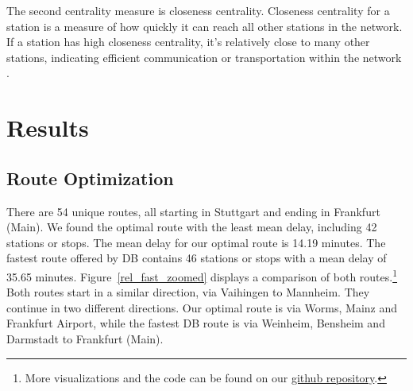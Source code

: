 \documentclass{article}
\theoremstyle{plain}
\theoremstyle{definition}
\theoremstyle{remark}
\begin{document}
The second centrality measure is closeness centrality. Closeness centrality for a station is a measure of how quickly it can reach all other stations in the network. If a station has high closeness centrality, it's relatively close to many other stations, indicating efficient communication or transportation within the network \cite{generic_comp}.

%

\section{Results}\label{sec:results}

\subsection{Route Optimization}\label{sec:results_route}

There are 54 unique routes, all starting in Stuttgart and ending in Frankfurt (Main). We found the optimal route with the least mean delay, including 42 stations or stops. The mean delay for our optimal route is 14.19 minutes. The fastest route offered by DB contains 46 stations or stops with a mean delay of 35.65 minutes. Figure~\ref{rel_fast_zoomed} displays a comparison of both routes.\footnote{More visualizations and the code can be found on our \href{https://github.com/frederikpanse/db_project}{github repository}.} Both routes start in a similar direction, via Vaihingen to Mannheim. They continue in two different directions. Our optimal route is via Worms, Mainz and Frankfurt Airport, while the fastest DB route is via Weinheim, Bensheim and Darmstadt to Frankfurt (Main).
\end{document}
